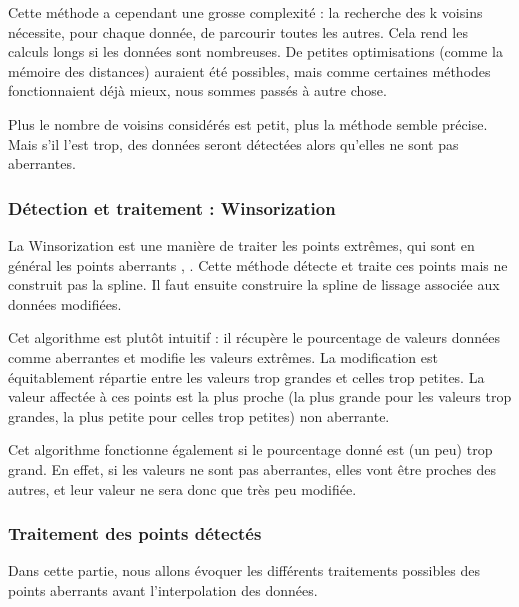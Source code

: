 \documentclass[a4paper,12pt]{article} %
\begin{document}
    					Cette méthode a cependant une grosse complexité : la recherche des k voisins nécessite, pour chaque donnée, de parcourir toutes les autres. Cela rend les calculs longs si les données sont nombreuses. De petites optimisations (comme la mémoire des distances) auraient été possibles, mais comme certaines méthodes fonctionnaient déjà mieux, nous sommes passés à autre chose.
                        
                        Plus le nombre de voisins considérés est petit, plus la méthode semble précise. Mais s'il l'est trop, des données seront détectées alors qu'elles ne sont pas aberrantes.

                
			\subsubsection{\label{winso}Détection et traitement : Winsorization}
				    La Winsorization est une manière de traiter les points extrêmes, qui sont en général les points aberrants \cite{Win1}, \cite{Win2}. Cette méthode détecte et traite ces points mais ne construit pas la spline. Il faut ensuite construire la spline de lissage associée aux données modifiées.
				    
				    Cet algorithme est plutôt intuitif : il récupère le pourcentage de valeurs données comme aberrantes et modifie les valeurs extrêmes. La modification est équitablement répartie entre les valeurs trop grandes et celles trop petites. La valeur affectée à ces points est la plus proche (la plus grande pour les valeurs trop grandes, la plus petite pour celles trop petites)  non aberrante.
				    
                    Cet algorithme fonctionne également si le pourcentage donné est (un peu) trop grand. En effet, si les valeurs ne sont pas aberrantes, elles vont être proches des autres, et leur valeur ne sera donc que très peu modifiée.
			\subsubsection{Traitement des points détectés}
				
    				Dans cette partie, nous allons évoquer les différents traitements possibles des points aberrants avant l'interpolation des données.
                        
                    
\end{document}
